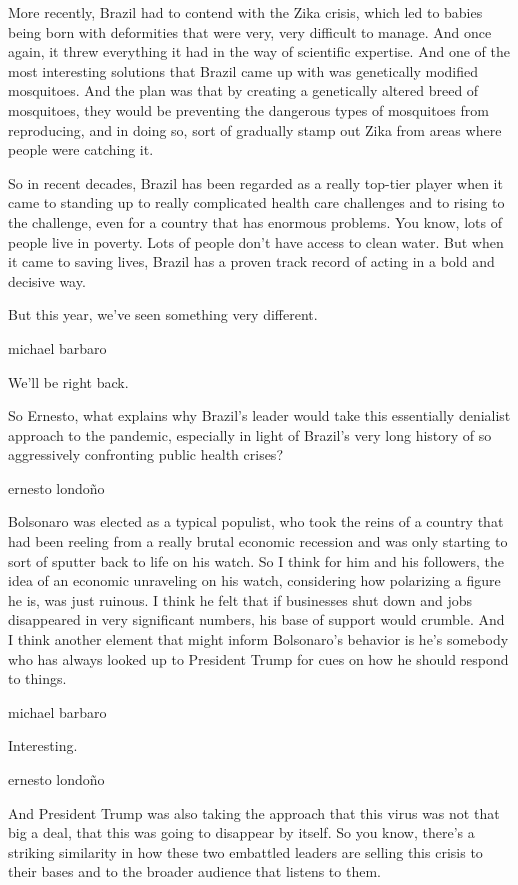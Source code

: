 More recently, Brazil had to contend with the Zika crisis, which led to
babies being born with deformities that were very, very difficult to
manage. And once again, it threw everything it had in the way of
scientific expertise. And one of the most interesting solutions that
Brazil came up with was genetically modified mosquitoes. And the plan
was that by creating a genetically altered breed of mosquitoes, they
would be preventing the dangerous types of mosquitoes from reproducing,
and in doing so, sort of gradually stamp out Zika from areas where
people were catching it.

So in recent decades, Brazil has been regarded as a really top-tier
player when it came to standing up to really complicated health care
challenges and to rising to the challenge, even for a country that has
enormous problems. You know, lots of people live in poverty. Lots of
people don't have access to clean water. But when it came to saving
lives, Brazil has a proven track record of acting in a bold and decisive
way.

But this year, we've seen something very different.

michael barbaro

We'll be right back.

So Ernesto, what explains why Brazil's leader would take this
essentially denialist approach to the pandemic, especially in light of
Brazil's very long history of so aggressively confronting public health
crises?

ernesto londoño

Bolsonaro was elected as a typical populist, who took the reins of a
country that had been reeling from a really brutal economic recession
and was only starting to sort of sputter back to life on his watch. So I
think for him and his followers, the idea of an economic unraveling on
his watch, considering how polarizing a figure he is, was just ruinous.
I think he felt that if businesses shut down and jobs disappeared in
very significant numbers, his base of support would crumble. And I think
another element that might inform Bolsonaro's behavior is he's somebody
who has always looked up to President Trump for cues on how he should
respond to things.

michael barbaro

Interesting.

ernesto londoño

And President Trump was also taking the approach that this virus was not
that big a deal, that this was going to disappear by itself. So you
know, there's a striking similarity in how these two embattled leaders
are selling this crisis to their bases and to the broader audience that
listens to them.

